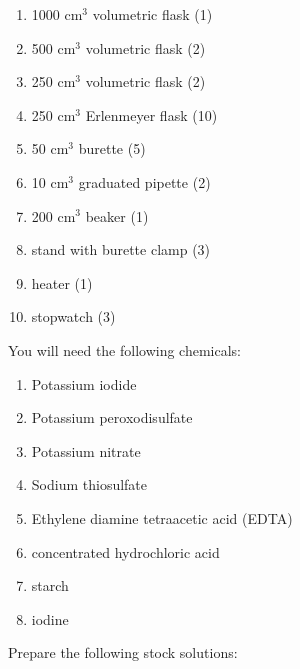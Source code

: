 \begin{enumerate}

\item  1000 cm$^3$ volumetric flask (1)

\item 500 cm$^3$ volumetric flask (2)

\item 250 cm$^3$ volumetric flask (2)

\item 250 cm$^3$ Erlenmeyer flask (10)

\item 50 cm$^3$ burette (5)

\item 10 cm$^3$ graduated pipette (2)

\item 200 cm$^3$ beaker (1)

\item stand with burette clamp (3)

\item heater (1) 

\item stopwatch (3)

\end{enumerate}


You will need the following chemicals:

\begin{enumerate}

\item Potassium iodide

\item Potassium peroxodisulfate

\item Potassium nitrate

\item Sodium thiosulfate

\item Ethylene diamine tetraacetic acid (EDTA)

\item concentrated hydrochloric acid

\item starch

\item iodine

\end{enumerate}


Prepare the following stock solutions:

